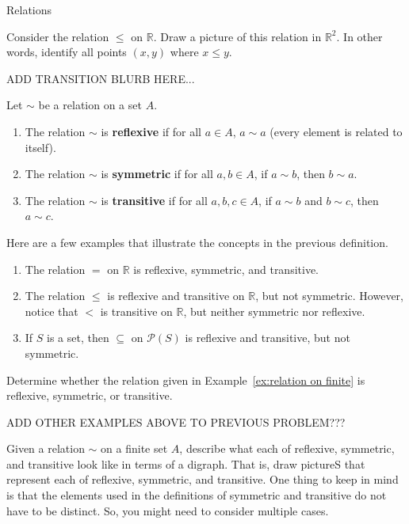 \begin{section}{Relations}
\begin{problem}
Consider the relation $\leq$ on $\mathbb{R}$. Draw a picture of this relation in $\mathbb{R}^2$. In other words, identify all points $(x,y)$ where $x\leq y$.
\end{problem}

ADD TRANSITION BLURB HERE...

\begin{definition}
Let $\sim$ be a relation on a set $A$.
\begin{enumerate}[label=\textrm{(\alph*)}]
\item The relation $\sim$ is \textbf{reflexive} if for all $a\in A$, $a\sim a$ (every element is related to itself).
\item The relation $\sim$ is \textbf{symmetric} if for all $a,b\in A$, if $a\sim b$, then $b\sim a$.
\item The relation $\sim$ is \textbf{transitive} if for all $a,b,c\in A$, if $a\sim b$ and $b\sim c$, then $a\sim c$.
\end{enumerate}
\end{definition}

\begin{example}
Here are a few examples that illustrate the concepts in the previous definition.
\begin{enumerate}[label=\textrm{(\alph*)}]
\item The relation $=$ on $\mathbb{R}$ is reflexive, symmetric, and transitive.
\item The relation $\leq$ is reflexive and transitive on $\mathbb{R}$, but not symmetric. However, notice that $<$ is transitive on $\mathbb{R}$, but neither symmetric nor reflexive.
\item If $S$ is a set, then $\subseteq$ on $\mathcal{P}(S)$ is reflexive and transitive, but not symmetric.
\end{enumerate}
\end{example}

\begin{problem}
Determine whether the relation given in Example~\ref{ex:relation on finite} is reflexive, symmetric, or transitive.
\end{problem}

ADD OTHER EXAMPLES ABOVE TO PREVIOUS PROBLEM???

\begin{problem}
Given a relation $\sim$ on a finite set $A$, describe what each of reflexive, symmetric, and transitive look like in terms of a digraph. That is, draw pictureS that represent each of reflexive, symmetric, and transitive. One thing to keep in mind is that the elements used in the definitions of symmetric and transitive do not have to be distinct.  So, you might need to consider multiple cases.
\end{problem}


\end{section}
